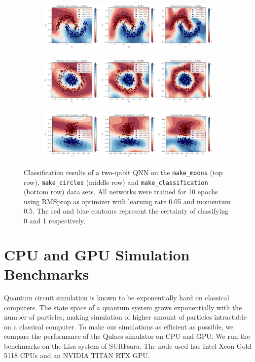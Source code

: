 \documentclass[a4paper,10pt]{article}
\begin{document}
\begin{appendices}
\begin{figure}[ht]
	\centering
	\begin{subfigure}{.9458\textwidth}
		\centering
		\includegraphics[width=1\linewidth]{figures/qnn_moons_classification.pdf}
	\end{subfigure}
	\begin{subfigure}{.9458\textwidth}
		\centering
		\includegraphics[width=1\linewidth]{figures/qnn_circles_classification.pdf}
	\end{subfigure}
	\begin{subfigure}{.9458\textwidth}
		\centering
		\includegraphics[width=1\linewidth]{figures/qnn_linear_classification.pdf}
	\end{subfigure}
	\cprotect\caption{Classification results of a two-qubit QNN on the \verb|make_moons| (top row), \verb|make_circles| (middle row) and \verb|make_classification| (bottom row) data sets. All networks were trained for 10 epochs using RMSprop as optimizer with learning rate 0.05 and momentum 0.5. The red and blue contours represent the certainty of classifying 0 and 1 respectively.}
	\label{fig:classification_decision_regions}
\end{figure}

\section{CPU and GPU Simulation Benchmarks} \label{sec:cpu-gpu-benchmark}
Quantum circuit simulation is known to be exponentially hard on classical computers.
The state space of a quantum system grows exponentially with the number of particles, making simulation of higher amount of particles intractable on a classical computer.
To make our simulations as efficient as possible, we compare the performance of the Qulacs simulator on CPU and GPU.
We run the benchmarks on the Lisa system of SURFsara.
The node used has Intel Xeon Gold 5118 CPUs and an NVIDIA TITAN RTX GPU.


\end{appendices}
\end{document}
